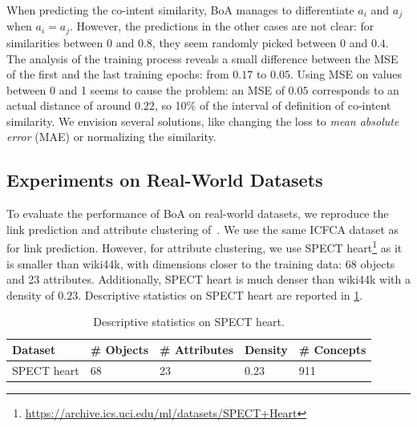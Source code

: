 When predicting the co-intent similarity, BoA manages to differentiate $a_i$ and $a_j$ when $a_i = a_j$.
However, the predictions in the other cases are not clear:
for similarities between $0$ and $0.8$, they seem randomly picked between $0$ and $0.4$.
The analysis of the training process reveals a small difference between the MSE of the first and the last training epochs: from $0.17$ to $0.05$.
Using MSE on values between 0 and 1 seems to cause the problem: an MSE of $0.05$ corresponds to an actual distance of around $0.22$, so 10\% of the interval of definition of co-intent similarity.
We envision several solutions, like changing the loss to \textit{mean absolute error} (MAE) or normalizing the similarity.











\subsection{Experiments on Real-World Datasets}\label{sec:boa-real-world-expe}

To evaluate the performance of BoA on real-world datasets, we reproduce the link prediction and attribute clustering of~\cite{fca2vec:2019:durrschnabel}.
%
We use the same ICFCA dataset as~\cite{fca2vec:2019:durrschnabel} for link prediction.
However, for attribute clustering, we use SPECT heart\footnote{\url{https://archive.ics.uci.edu/ml/datasets/SPECT+Heart}} as it is smaller than {wiki44k}, with dimensions closer to the training data: 68 objects and 23 attributes.
Additionally, SPECT heart is much denser than wiki44k with a density of $0.23$.
Descriptive statistics on SPECT heart are reported in \cref{tab:spect}.

\begin{table}
    \centering
    \begin{tabular}{lllll}
    \toprule
    Dataset & \# Objects & \# Attributes & Density & \# Concepts\\
    \midrule
    SPECT heart & 68 & 23 & 0.23 & 911 \\
    \bottomrule
    \end{tabular}
    \caption{Descriptive statistics on SPECT heart.}
    \label{tab:spect}
\end{table}

